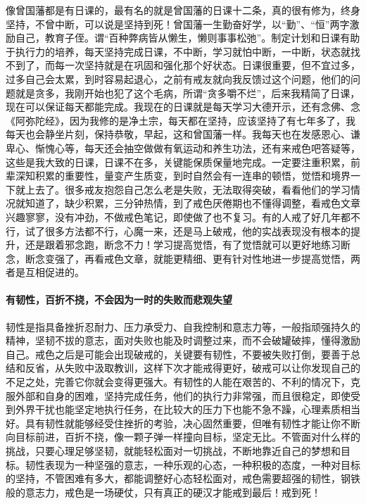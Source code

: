 像曾国藩都是有日课的，最有名的就是曾国藩的日课十二条，真的很有修为，终身坚持，不曾中断，可以说是坚持到死！曾国藩一生勤奋好学，以“勤”、“恒”两字激励自己，教育子侄。谓“百种弊病皆从懒生，懒则事事松弛”。制定计划和日课有助于执行力的培养，每天坚持完成日课，不中断，学习就怕中断，一中断，状态就找不到了，而每一次坚持就是在巩固和强化那个好状态。日课很重要，但不宜过多，过多自己会太累，到时容易起退心，之前有戒友就向我反馈过这个问题，他们的问题就是贪多，我刚开始也犯了这个毛病，所谓“贪多嚼不烂”，后来我精简了日课，现在可以保证每天都能完成。我现在的日课就是每天学习大德开示，还有念佛、念《阿弥陀经》，因为我修的是净土宗，每天都在坚持，应该坚持了有七年多了，我每天也会静坐片刻，保持恭敬，早起，这和曾国藩一样。我每天也在发感恩心、谦卑心、惭愧心等，每天还会抽空做做有氧运动和养生功法，还有来戒色吧答疑等，这些是我大致的日课，日课不在多，关键能保质保量地完成。一定要注重积累，前辈深知积累的重要性，量变产生质变，到时自然会有一连串的顿悟，觉悟和境界一下就上去了。很多戒友抱怨自己怎么老是失败，无法取得突破，看看他们的学习情况就知道了，缺少积累，三分钟热情，到了戒色厌倦期也不懂得调整，看戒色文章兴趣寥寥，没有冲劲，不做戒色笔记，即使做了也不复习。有的人戒了好几年都不行，试了很多方法都不行，心魔一来，还是马上破戒，他的实战表现没有根本的提升，还是跟着邪念跑，断念不力！学习提高觉悟，有了觉悟就可以更好地练习断念，断念变强了，再看戒色文章，就能更精细、更有针对性地进一步提高觉悟，两者是互相促进的。

\paragraph{有韧性，百折不挠，不会因为一时的失败而悲观失望}

韧性是指具备挫折忍耐力、压力承受力、自我控制和意志力等，一般指顽强持久的精神，坚韧不拔的意志，面对失败也能及时调整过来，而不会破罐破摔，懂得激励自己。戒色之后是可能会出现破戒的，关键要有韧性，不要被失败打倒，要善于总结和反省，从失败中汲取教训，这样下次才能戒得更好，破戒可以让你发现自己的不足之处，完善它你就会变得更强大。有韧性的人能在艰苦的、不利的情况下，克服外部和自身的困难，坚持完成任务，他们的执行力非常强，而且很稳定，即使受到外界干扰也能坚定地执行任务，在比较大的压力下也能不急不躁，心理素质相当好。具有韧性就能够经受住挫折的考验，决心固然重要，但唯有韧性才能让你不断向目标前进，百折不挠，像一颗子弹一样撞向目标，坚定无比。不管面对什么样的挑战，只要心理足够坚韧，就能轻松面对一切挑战，不断地靠近自己的梦想和目标。韧性表现为一种坚强的意志，一种乐观的心态，一种积极的态度，一种对目标的坚持，不管困难有多大，都能调整好心态轻松面对，戒色需要超强的韧性，钢铁般的意志力，戒色是一场硬仗，只有真正的硬汉才能戒到最后！戒到死！

